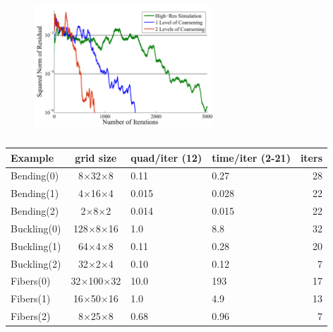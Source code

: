\begin{figure}
	\centering
	\includegraphics[width=0.6\textwidth]{figs/CGConverge.pdf}
	\caption{
	}\label{fig:cg}
\end{figure}

\begin{table}
	\centering
	\footnotesize
	\begin{tabular}{l c p{1cm} p{1cm} r }
		\hline 
		\textbf{Example} &\textbf{grid size}&\textbf{quad/iter} (12)&\textbf{time/iter} (2-21)&\textbf{iters}\\
		\hline 
		{\color{HiResColor}Bending(0)} &8$\times$32$\times$8   &  0.11  &0.27 &28\\
		{\color{DDFEMColor}Bending(1)} &4$\times$16$\times$4   &  0.015 &0.028&22\\
		{\color{DDFEMColor}Bending(2)} &2$\times$8$\times$2    &  0.014 &0.015&22\\
		\hline
		{\color{HiResColor}Buckling(0)} &128$\times$8$\times$16&  1.0   &8.8 &32\\
		{\color{DDFEMColor}Buckling(1)} &64$\times$4$\times$8  &  0.11  &0.28&20\\
		{\color{DDFEMColor}Buckling(2) }&32$\times$2$\times$4  &  0.10  &0.12&7\\
		\hline
		{\color{HiResColor}Fibers(0)} &32$\times$100$\times$32 & 10.0   &193&17\\
		{\color{DDFEMColor}Fibers(1)} &16$\times$50$\times$16  &  1.0   &4.9&13\\
		{\color{DDFEMColor}Fibers(2)} &8$\times$25$\times$8    &  0.68  &0.96&7\\
		\hline
	\end{tabular}
	\caption{}
	\label{table:quadPerformance}
\end{table}
